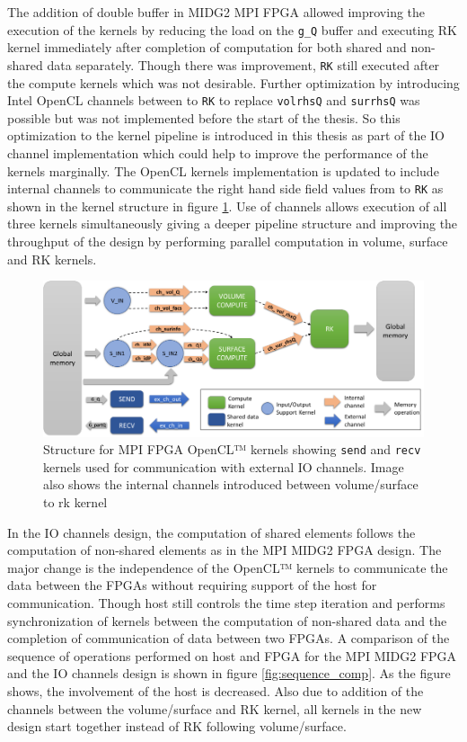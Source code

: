 The addition of double buffer in MIDG2 MPI FPGA allowed improving the execution of the kernels
by reducing the load on the \texttt{g\_Q} buffer and executing RK kernel immediately after completion
of computation for both shared and non-shared data separately. Though there was improvement,
\texttt{RK} still executed after the compute kernels which was not desirable. Further optimization
by introducing Intel OpenCL channels between  to \texttt{RK} to replace
\texttt{volrhsQ} and \texttt{surrhsQ} was possible but was not implemented before the start of the thesis.
So this optimization to the kernel pipeline is introduced in this thesis as part of the IO channel implementation
which could help to improve the performance of the kernels marginally.
The OpenCL kernels implementation is updated to include internal channels to
communicate the right hand side field values
from  to \texttt{RK} as shown in the kernel structure
in figure \ref{fig:iochan_kernstruc}. Use of channels allows execution of all three
kernels simultaneously giving a deeper pipeline structure and improving the throughput
of the design by performing parallel computation in volume, surface and RK kernels.

\begin{figure}[h]%
    \centering
    \includegraphics[width=1.0\textwidth]{images/iochan_kernstruc}
    \caption{Structure for MPI FPGA OpenCL™ kernels showing \texttt{send} and \texttt{recv}
    kernels used for communication with external IO channels. Image also shows the internal
    channels introduced between volume/surface to rk kernel}
    \label{fig:iochan_kernstruc}
\end{figure}

In the IO channels design, the computation of shared elements follows the computation of
non-shared elements as in the MPI MIDG2 FPGA design. The major change is the independence of the OpenCL™ kernels to
communicate the data between the FPGAs without requiring support of the host for
communication. Though host still controls the time step iteration and performs synchronization of kernels between
the computation of non-shared data and the completion of communication of data between two FPGAs.
A comparison of the sequence of operations performed on host and FPGA for the MPI MIDG2 FPGA and
the IO channels design is shown in figure \ref{fig:sequence_comp}. As the figure shows,
the involvement of the host is decreased. Also due to addition of the channels between
the volume/surface and RK kernel, all kernels in the new design start together instead
of RK following volume/surface.

